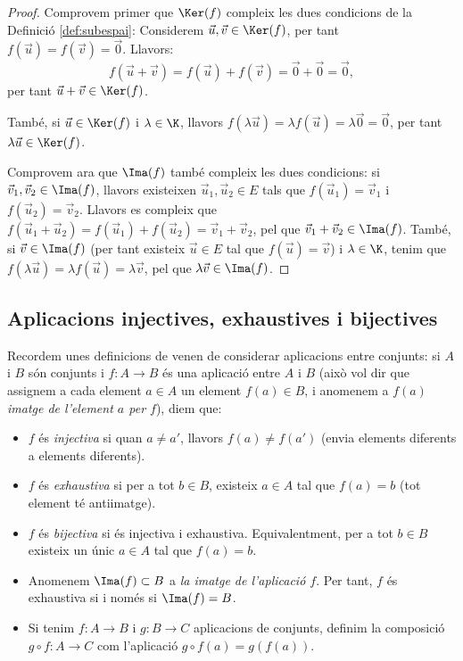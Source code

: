 \begin{proof}
	Comprovem primer que $\Ker(f)$ compleix les dues condicions de la Definició \ref{def:subespai}:
	Considerem $\vec u, \vec v \in \Ker(f)$, per tant $f(\vec u)=f(\vec v)=\vec 0$. Llavors:
	$$
	f(\vec u+\vec v)=f(\vec u)+f(\vec v)=\vec 0+\vec 0 =\vec 0 ,
	$$
	per tant $\vec u+\vec v \in \Ker(f)$.
	
	També, si $\vec u \in \Ker(f)$ i $\lambda\in\K$, llavors $f(\lambda \vec u)=\lambda f(\vec u)=\lambda \vec 0=\vec 0$, per tant $\lambda \vec u\in\Ker(f)$.
	
	Comprovem ara que $\Ima(f)$ també compleix les dues condicions: si $\vec v_1,\vec v_2 \in\Ima(f)$, llavors existeixen $\vec u_1, \vec u_2 \in E$ tals que $f(\vec u_1)=\vec v_1$ i $f(\vec u_2)=\vec v_2$. Llavors es compleix que $f(\vec u_1+\vec u_2)=f(\vec u_1)+f(\vec u_2)=\vec v_1+\vec v_2$, pel que $\vec v_1+\vec v_2 \in \Ima(f)$. També, si $\vec v\in \Ima(f)$ (per tant existeix $\vec u\in E$ tal que $f(\vec u)=\vec v$) i $\lambda\in\K$, tenim que $f(\lambda \vec u)=\lambda f(\vec u)=\lambda \vec v$, pel que $\lambda \vec v \in \Ima(f)$.
\end{proof}



\subsection{Aplicacions injectives, exhaustives i bijectives}
Recordem unes definicions de venen de considerar aplicacions entre conjunts: si $A$ i $B$ són conjunts i $f\colon A \to B$ és una aplicació entre $A$ i $B$ (això vol dir que assignem a cada element $a\in A$ un element $f(a)\in B$, i anomenem a $f(a)$ \emph{imatge de l'element $a$ per $f$}), diem que:
\begin{itemize}
	\item $f$ és \emph{injectiva} si quan $a\neq a'$, llavors $f(a)\neq f(a')$ (envia elements diferents a elements diferents).
	\item $f$ és \emph{exhaustiva} si per a tot $b\in B$, existeix $a\in A$ tal que $f(a)=b$ (tot element té antiimatge).
	\item $f$ és \emph{bijectiva} si és injectiva i exhaustiva. Equivalentment, per a tot $b\in B$ existeix un únic $a\in A$ tal que $f(a)=b$.
	\item Anomenem $\Ima(f)\subset B$ a \emph{la imatge de l'aplicació $f$}. Per tant, $f$ és exhaustiva si i només si $\Ima(f)=B$.
	\item Si tenim $f\colon A \to B$ i $g\colon B \to C$ aplicacions de conjunts, definim la composició $g\circ f \colon A \to C$ com l'aplicació $g\circ f(a)=g(f(a))$.
\end{itemize}

